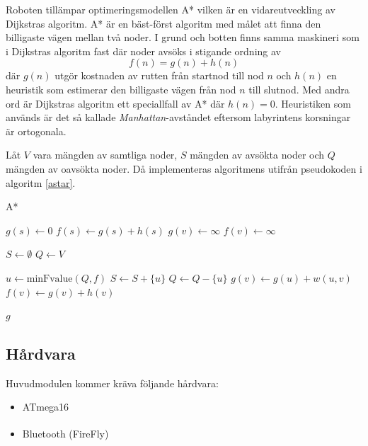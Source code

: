 \documentclass[11pt]{article}
\begin{document}
\begin{flushleft}
Roboten tillämpar optimeringsmodellen A* vilken är en vidareutveckling av Dijkstras algoritm. A* är en bäst-först algoritm med målet att finna den billigaste vägen mellan två noder. I grund och botten finns samma maskineri som i Dijkstras algoritm fast där noder avsöks i stigande ordning av
\begin{equation*}
	f(n) = g(n) + h(n)
\end{equation*}
där $g(n)$ utgör kostnaden av rutten från startnod till nod $n$ och $h(n)$ en heuristik som estimerar den billigaste vägen från nod $n$ till slutnod. Med andra ord är Dijkstras algoritm ett speciallfall av A* där $h(n) = 0$. Heuristiken som används är det så kallade \emph{Manhattan}-avståndet eftersom labyrintens korsningar är ortogonala.

Låt $V$ vara mängden av samtliga noder, $S$ mängden av avsökta noder och $Q$ mängden av oavsökta noder. Då implementeras algoritmens utifrån pseudokoden i algoritm \ref{astar}.

\begin{algorithm}[H]
	\caption{A*} \label{astar}
	\begin{algorithmic}[1]
			\State $g(s) \gets 0$
			\State $f(s) \gets g(s) + h(s)$
				\State $g(v) \gets \infty$
				\State $f(v) \gets \infty$
			\EndFor
			
			\State $S \gets \emptyset$
			\State $Q \gets V$
			
				\State $u \gets \textrm{minFvalue}(Q,f)$%
				\State $S \gets S +  \{ u\}$
				\State $Q \gets Q - \{ u\}$
						\State $g(v) \gets g(u) + w(u,v)$
						\State $f(v) \gets g(v) + h(v)$
					\EndIf
				\EndFor
			\EndWhile
			
			\Return $g$
		\EndFunction
	\end{algorithmic}
\end{algorithm}
  

\subsection{Hårdvara}
Huvudmodulen kommer kräva följande hårdvara:
\begin{itemize}
	\item ATmega16
	\item  Bluetooth\textsuperscript{\circledR}  (FireFly)
\end{itemize}



\end{flushleft}
\end{document}
